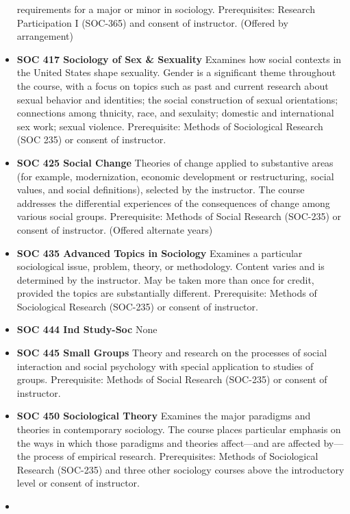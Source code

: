 \documentclass[
  letterpaper,
]{scrbook}
\begin{document}
\begin{itemize}
  requirements for a major or minor in sociology. Prerequisites:
  Research Participation I (SOC-365) and consent of instructor. (Offered
  by arrangement)
\item
  \textbf{SOC 417 Sociology of Sex \& Sexuality} Examines how social
  contexts in the United States shape sexuality. Gender is a significant
  theme throughout the course, with a focus on topics such as past and
  current research about sexual behavior and identities; the social
  construction of sexual orientations; connections among thnicity, race,
  and sexulaity; domestic and international sex work; sexual violence.
  Prerequisite: Methods of Sociological Research (SOC 235) or consent of
  instructor.\\
\item
  \textbf{SOC 425 Social Change} Theories of change applied to
  substantive areas (for example, modernization, economic development or
  restructuring, social values, and social definitions), selected by the
  instructor. The course addresses the differential experiences of the
  consequences of change among various social groups. Prerequisite:
  Methods of Social Research (SOC-235) or consent of instructor.
  (Offered alternate years)
\item
  \textbf{SOC 435 Advanced Topics in Sociology} Examines a particular
  sociological issue, problem, theory, or methodology. Content varies
  and is determined by the instructor. May be taken more than once for
  credit, provided the topics are substantially different. Prerequisite:
  Methods of Sociological Research (SOC-235) or consent of instructor.
\item
  \textbf{SOC 444 Ind Study-Soc} None\\
\item
  \textbf{SOC 445 Small Groups} Theory and research on the processes of
  social interaction and social psychology with special application to
  studies of groups. Prerequisite: Methods of Social Research (SOC-235)
  or consent of instructor.
\item
  \textbf{SOC 450 Sociological Theory} Examines the major paradigms and
  theories in contemporary sociology. The course places particular
  emphasis on the ways in which those paradigms and theories
  affect---and are affected by---the process of empirical research.
  Prerequisites: Methods of Sociological Research (SOC-235) and three
  other sociology courses above the introductory level or consent of
  instructor.\\
\item

\end{itemize}
\end{document}
